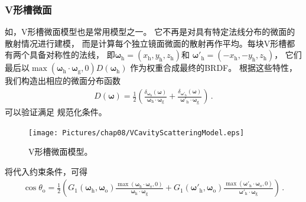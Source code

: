 \subsubsection*{V形槽微面}
如，V形槽微面模型也是常用模型之一。
它不再是对具有特定法线分布的微面的散射情况进行建模，
而是计算每个独立镜面微面的散射再作平均。每块V形槽都有两个具备对称性的法线，
即${\bm\omega}_{\mathrm{h}}=(x_{\mathrm{h}},y_{\mathrm{h}},z_{\mathrm{h}})$和
${\bm\omega}'_{\mathrm{h}}=(-x_{\mathrm{h}},-y_{\mathrm{h}},z_{\mathrm{h}})$，
它们最后以$\max({\bm\omega}_{\mathrm{h}}\cdot{\bm\omega}_{\mathrm{g}},0)D({\bm\omega}_{\mathrm{h}})$
作为权重合成最终的BRDF。
根据这些特性，我们构造出相应的微面分布函数
\begin{align}\label{eq:08ex01-VCavityScatteringNormalDistribution}
    D({\bm\omega})=\frac{1}{2}\left(
    \frac{\delta_{{\bm\omega}_{\mathrm{h}}}({\bm\omega})}
    {{\bm\omega}_{\mathrm{h}}\cdot{\bm\omega}_{\mathrm{g}}}
    +\frac{\delta_{{\bm\omega}'_{\mathrm{h}}}({\bm\omega})}
    {{\bm\omega}'_{\mathrm{h}}\cdot{\bm\omega}_{\mathrm{g}}}\right)\, .
\end{align}
可以验证满足
规范化条件。

\begin{figure}[htbp]
    \centering
    \texttt{[image: Pictures/chap08/VCavityScatteringModel.eps]}
    \caption{V形槽微面模型。}
    \label{fig:08ex01-V-cavityScatteringModel}
\end{figure}

将代入约束条件，可得
\begin{align}\label{eq:08ex01-V-Cavity-configurations}
    \cos\theta_{\mathrm{o}}=\frac{1}{2}\left(
    G_1({\bm\omega}_{\mathrm{h}},{\bm\omega}_{\mathrm{o}})
    \frac{\max({\bm\omega}_{\mathrm{h}}\cdot{\bm\omega}_{\mathrm{o}},0)}
    {{\bm\omega}_{\mathrm{h}}\cdot{\bm\omega}_{\mathrm{g}}}
    +G_1({\bm\omega}'_{\mathrm{h}},{\bm\omega}_{\mathrm{o}})
    \frac{\max({\bm\omega}'_{\mathrm{h}}\cdot{\bm\omega}_{\mathrm{o}},0)}
    {{\bm\omega}'_{\mathrm{h}}\cdot{\bm\omega}_{\mathrm{g}}}\right)\, .
\end{align}

